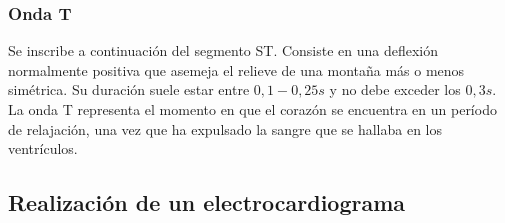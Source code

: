 \documentclass[spanish,11pt,letterpaper,oneside]{memoir}
\begin{document}
\subsubsection{Onda T}

Se inscribe a continuación del segmento ST. Consiste en una deflexión normalmente positiva que asemeja el relieve de una montaña más o menos simétrica. Su duración suele estar entre $0,1-0,25 s$ y no debe exceder los $0,3 s$. La onda T representa el momento en que el corazón se encuentra en un período de relajación, una vez que ha expulsado la sangre que se hallaba en los ventrículos.

\subsection{Realización de un electrocardiograma}
\end{document}
